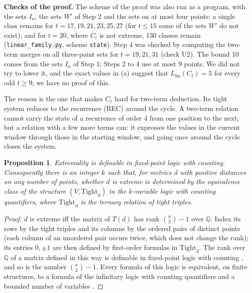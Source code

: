 \documentclass[11pt,a4paper]{article}
\newtheorem{proposition}[theorem]{Proposition}
\theoremstyle{definition}
\theoremstyle{remark}
\newcommand{\Q}{\mathbb{Q}}
\newcommand{\file}[1]{\texttt{#1}}
\newcommand{\comp}[1]{\medskip\noindent\textbf{#1}}
\begin{document}
\comp{Checks of the proof.} The scheme of the proof was also run as a program, with the sets $I_a$, the sets $W'$
of Step 2 and the sets on at most four points: a single class remains for $t = 17, 19, 21, 23, 25, 27$ (for $t \le 15$ some of the sets $W'$ do not exist), and for $t = 20$, where $C_t$ is
not extreme, 130 classes remain (\file{linear\_family.py}, scheme \file{state}). Step 4 was checked by computing the
two-term merges on all three-point sets for $t = 19, 21, 31$ (check U2). The bound 10 comes from the sets $I_a$ of
Step 1; Steps 2 to 4 use at most 9 points. We did not try to lower it, and the exact values in (a) suggest that
$L_{\mathrm{lin}}(C_t) = 5$ for every odd $t \ge 9$; we have no proof of this.

The reason is the one that makes $C_t$ hard for two-term deduction. Its tight system reduces to the recurrence
(REC) around the cycle. A two-term relation cannot carry the state of a recurrence of order 4 from one position to
the next, but a relation with a few more terms can: it expresses the values in the current window through those
in the starting window, and going once around the cycle closes the system.

\begin{proposition}\label{prop:fpc}
Extremality is definable in fixed-point logic with counting. Consequently there is an integer $k$ such that, for
metrics $d$ with positive distances on any number of points, whether $d$ is extreme is determined by the
equivalence class of the structure $(V, \mathrm{Tight}_d)$ in the $k$-variable logic with counting quantifiers,
where $\mathrm{Tight}_d$ is the ternary relation of tight triples.
\end{proposition}

\begin{proof}
$d$ is extreme iff the matrix of $T(d)$ has rank $\binom n2 - 1$ over $\Q$. Index its rows by the tight triples
and its columns by the ordered pairs of distinct points (each column of an unordered pair occurs twice, which
does not change the rank); its entries $0, \pm 1$ are then defined by first-order formulas in
$\mathrm{Tight}_d$. The rank over $\Q$ of a matrix defined in this way is definable in fixed-point logic with
counting \cite[Corollary VI.6]{DGHL09}, and so is the number $\binom n2 - 1$. Every formula of this logic is
equivalent, on finite structures, to a formula of the infinitary logic with counting quantifiers and a bounded
number of variables \cite{O97}.
\end{proof}
\end{document}
